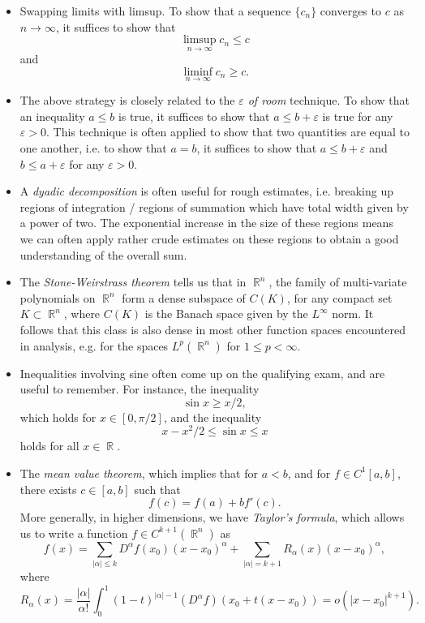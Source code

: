 \documentclass{exam}
\DeclareMathOperator{\RR}{\mathbb{R}}
\theoremstyle{problemstyle}
\newcommand{\1}[1]{\textbf{1}_{\left[#1\right]}} %
\begin{document}
\begin{itemize}
	\item Swapping limits with limsup. To show that a sequence $\{ c_n \}$ converges to $c$ as $n \to \infty$, it suffices to show that
	\[ \limsup_{n \to \infty} c_n \leq c \]
	and
	\[ \liminf_{n \to \infty} c_n \geq c. \]

	\item The above strategy is closely related to the \emph{$\varepsilon$ of room} technique. To show that an inequality $a \leq b$ is true, it suffices to show that $a \leq b + \varepsilon$ is true for any $\varepsilon > 0$. This technique is often applied to show that two quantities are equal to one another, i.e. to show that $a = b$, it suffices to show that $a \leq b + \varepsilon$ and $b \leq a + \varepsilon$ for any $\varepsilon > 0$.

	\item A \emph{dyadic decomposition} is often useful for rough estimates, i.e. breaking up regions of integration / regions of summation which have total width given by a power of two. The exponential increase in the size of these regions means we can often apply rather crude estimates on these regions to obtain a good understanding of the overall sum.

	\item The \emph{Stone-Weirstrass theorem} tells us that in $\RR^n$, the family of multi-variate polynomials on $\RR^n$ form a dense subspace of $C(K)$, for any compact set $K \subset \RR^n$, where $C(K)$ is the Banach space given by the $L^\infty$ norm. It follows that this class is also dense in most other function spaces encountered in analysis, e.g. for the spaces $L^p(\RR^n)$ for $1 \leq p < \infty$.

	\item Inequalities involving sine often come up on the qualifying exam, and are useful to remember. For instance, the inequality
	\[ \sin x \geq x/2, \]
	which holds for $x \in [0, \pi/2]$, and the inequality
	\[ x - x^2/2 \leq \sin x \leq x \]
	holds for all $x \in \RR$.

	\item The \emph{mean value theorem}, which implies that for $a < b$, and for $f \in C^1[a,b]$, there exists $c \in [a,b]$ such that
	\[ f(c) = f(a) + b f'(c). \]
	More generally, in higher dimensions, we have \emph{Taylor's formula}, which allows us to write a function $f \in C^{k+1}(\RR^n)$ as
	\[ f(x) = \sum_{|\alpha| \leq k} D^\alpha f(x_0) (x - x_0)^\alpha + \sum_{|\alpha| = k+1} R_\alpha(x) (x - x_0)^\alpha, \]
	where
	\[ R_\alpha(x) = \frac{|\alpha|}{\alpha!} \int_0^1 (1 - t)^{|\alpha|-1} (D^\alpha f)(x_0 + t(x - x_0)) = o(|x - x_0|^{k+1}). \]


\end{itemize}
\end{document}
